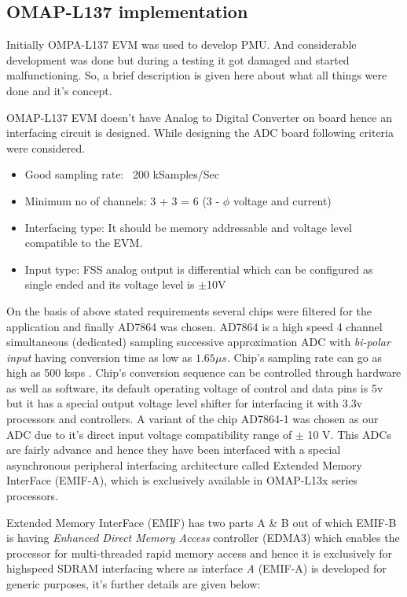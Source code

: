 \begin{appendix}
\chapter{OMAP-L137 implementation}
Initially OMPA-L137 EVM was used to develop PMU. And considerable development was done but during a testing it got damaged and started malfunctioning. So, a brief description is given here about what all things were done and it's concept.

 OMAP-L137 EVM doesn't have Analog to Digital Converter on board hence an interfacing circuit is designed. While designing the ADC board following criteria were considered.
\begin{itemize}
	\item Good sampling rate: ~200 kSamples/Sec
	\item Minimum no of channels: 3 + 3 = 6 (3 - $\phi$ voltage and current) 
	\item Interfacing type: It should be memory addressable and voltage level compatible  to the EVM.
	\item Input type: FSS analog output is differential which can be configured as single ended and its voltage level is $\pm$10V
\end{itemize}
  
On the basis of above stated requirements several chips were filtered for the application and finally AD7864 was chosen. AD7864 is a high speed 4 channel simultaneous (dedicated) sampling successive approximation ADC with \textit{bi-polar input} having conversion time as low as $1.65 \mu s$. Chip's sampling rate can go as high as 500 ksps \cite{uguide:adc}. Chip's conversion sequence can be controlled through hardware as well as software, its default operating voltage of control and data pins is 5v but it has a special output voltage level shifter for interfacing it with 3.3v processors and controllers. A variant of the chip AD7864-1 was chosen as our ADC due to it's direct input voltage compatibility range of $\pm$ 10 V. This ADCs are fairly advance and hence they have been interfaced with a special asynchronous peripheral interfacing architecture called Extended Memory InterFace (EMIF-A), which is exclusively available in OMAP-L13x series processors.

 Extended Memory InterFace (EMIF) has two parts A \& B out of which EMIF-B is having \textit{Enhanced Direct Memory Access} controller (EDMA3) which enables the processor for multi-threaded rapid memory access and hence it is exclusively for highspeed SDRAM interfacing where as interface \textit{A} (EMIF-A) is developed for generic purposes, it's further details are given below:


\end{appendix}
